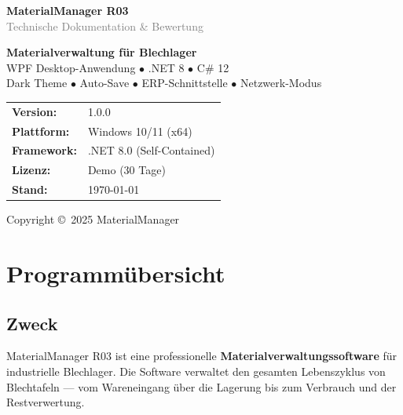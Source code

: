 \documentclass[a4paper,12pt]{article}
\begin{document}
\begin{titlepage}
\centering
\vspace*{3cm}

{\Huge\bfseries\textcolor{primary}{MaterialManager R03}}\\[0.5cm]
{\Large\textcolor{gray}{Technische Dokumentation \& Bewertung}}\\[2cm]

\begin{tcolorbox}[colback=dark,colframe=dark,coltext=white,width=12cm,halign=center]
\centering
{\large\bfseries Materialverwaltung für Blechlager}\\[0.3cm]
{\normalsize WPF Desktop-Anwendung $\bullet$ .NET 8 $\bullet$ C\# 12}\\[0.3cm]
{\small Dark Theme $\bullet$ Auto-Save $\bullet$ ERP-Schnittstelle $\bullet$ Netzwerk-Modus}
\end{tcolorbox}

\vspace{2cm}

\begin{tabular}{ll}
\textbf{Version:} & 1.0.0 \\
\textbf{Plattform:} & Windows 10/11 (x64) \\
\textbf{Framework:} & .NET 8.0 (Self-Contained) \\
\textbf{Lizenz:} & Demo (30 Tage) \\
\textbf{Stand:} & \today \\
\end{tabular}

\vfill
{\small Copyright \copyright\ 2025 MaterialManager}
\end{titlepage}

\tableofcontents
\newpage

\section{Programmübersicht}

\subsection{Zweck}
MaterialManager R03 ist eine professionelle \textbf{Materialverwaltungssoftware} für industrielle Blechlager. Die Software verwaltet den gesamten Lebenszyklus von Blechtafeln — vom Wareneingang über die Lagerung bis zum Verbrauch und der Restverwertung.
\end{document}
